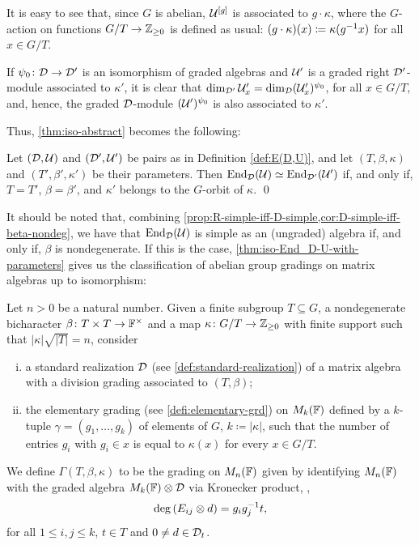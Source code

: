 It is easy to see that, since $G$ is abelian, $\mathcal U^{[g]}$ is associated to $g \cdot \kappa$, where the $G$-action on functions $G/T \to \mathbb{Z}_{\geq 0}$ is defined as usual: $(g\cdot \kappa) (x) \coloneqq \kappa(g^{-1} x)$ for all $x\in G/T$.

If $\psi_0\colon \mathcal{D} \to \mathcal{D}'$ is an isomorphism of graded algebras and $\mathcal U'$ is a graded right $\mathcal{D}'$-module associated to $\kappa'$, it is clear that $\dim_{\mathcal{D}'} \mathcal U_x' = \dim_{\mathcal{D}} (\mathcal U_x')^{\psi_0}$, for all $x \in G/T$, and, hence, the graded $\mathcal{D}$-module $(\mathcal U')^{\psi_0}$ is also associated to $\kappa'$. 

Thus, \cref{thm:iso-abstract} becomes the following:

\begin{thm}\label{thm:iso-End_D-U-with-parameters}
	Let $(\mathcal{D}, \mathcal U)$ and $(\mathcal{D}', \mathcal U')$ be pairs as in Definition \ref{def:E(D,U)}, and let $(T, \beta, \kappa)$ and $(T', \beta', \kappa')$ be their parameters. 
	Then $\operatorname{End}_{\mathcal{D}} (\mathcal U) \simeq \operatorname{End}_{\mathcal{D}'} (\mathcal U')$ if, and only if, $T = T'$, $\beta = \beta'$, and $\kappa'$ belongs to the $G$-orbit of $\kappa$. \qed
\end{thm}

It should be noted that, combining \cref{prop:R-simple-iff-D-simple,cor:D-simple-iff-beta-nondeg}, we have that $\operatorname{End}_{\mathcal{D}} (\mathcal U)$ is simple as an (ungraded) algebra if, and only if, $\beta$ is nondegenerate. 
If this is the case, \cref{thm:iso-End_D-U-with-parameters} gives us the classification of abelian group gradings on matrix algebras up to isomorphism:

\begin{defi}\label{def:Gamma-T-beta-kappa}
    Let $n > 0$ be a natural number. 
    Given a finite subgroup $T \subseteq G$, a nondegenerate bicharacter $\beta\colon T\times T \to \mathbb{F}^\times$ and a map $\kappa\colon G/T \to \mathbb{Z}_{\geq 0}$ with finite support such that $|\kappa| \sqrt{|T|} = n$, consider
    \begin{enumerate}[(i)]
        \item a standard realization $\mathcal{D}$ (see \cref{def:standard-realization}) of a matrix algebra with a division grading associated to $(T,\beta)$;
        \item the elementary grading (see \cref{defi:elementary-grd}) on $M_{k}(\mathbb{F})$ defined by a $k$-tuple $\gamma = (g_1, \ldots, g_{k})$ of elements of $G$, $k \coloneqq |\kappa|$, such that the number of entries $g_i$ with $g_i\in x$ is equal to $\kappa (x)$ for every $x\in G/T$. 
    \end{enumerate}
    We define $\Gamma (T, \beta, \kappa)$ to be the grading on $M_n(\mathbb{F})$ given by identifying $M_n(\mathbb{F})$ with the graded algebra $M_k(\mathbb{F}) \otimes \mathcal{D}$ via Kronecker product, \ie,
    \[
        \deg \left( E_{ij} \otimes d \right) = g_ig_j^{-1} t,
    \] 
    for all $1\leq i, j \leq k$, $t\in T$ and $0 \neq d \in \mathcal{D}_t$.
\end{defi}

